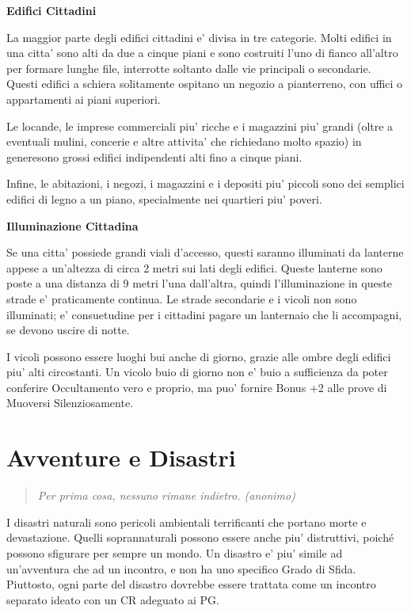\documentclass[a4paper,11pt,twoside,openany]{book}
\begin{document}
{		\textbf{Edifici Cittadini}
		
		La maggior parte degli edifici cittadini e' divisa in tre categorie. Molti edifici in una citta' sono alti da due a cinque piani e sono costruiti l'uno di fianco all'altro per formare lunghe file, interrotte soltanto dalle vie principali o secondarie. Questi edifici a schiera solitamente ospitano un negozio a pianterreno, con uffici o appartamenti ai piani superiori.
		
		Le locande, le imprese commerciali piu' ricche e i magazzini piu' grandi (oltre a eventuali mulini, concerie e altre attivita' che richiedano molto spazio) in generesono grossi edifici indipendenti alti fino a cinque piani.
		
		Infine, le abitazioni, i negozi, i magazzini e i depositi piu' piccoli sono dei semplici edifici di legno a un piano, specialmente nei quartieri piu' poveri.
		
		\textbf{Illuminazione Cittadina}
		
		Se una citta' possiede grandi viali d'accesso, questi saranno illuminati da lanterne appese a un'altezza di circa 2 metri sui lati degli edifici. Queste lanterne sono poste a una distanza di 9 metri l'una dall'altra, quindi l'illuminazione in queste strade e' praticamente continua. Le strade secondarie e i vicoli non sono illuminati; e' consuetudine per i cittadini pagare un lanternaio che li accompagni, se devono uscire di notte.
		
		I vicoli possono essere luoghi bui anche di giorno, grazie alle ombre degli edifici piu' alti circostanti. Un vicolo buio di giorno non e' buio a sufficienza da poter conferire Occultamento vero e proprio, ma puo' fornire Bonus +2 alle prove di Muoversi Silenziosamente.
		
		\pagebreak
		
		\section{Avventure e Disastri}
		
		\label{avventure-e-disastri}
		\begin{quote}\textit{
				Per prima cosa, nessuno rimane indietro. (anonimo)
		}\end{quote}
		I disastri naturali sono pericoli ambientali terrificanti che portano morte e devastazione. Quelli soprannaturali posso­no essere anche piu' distruttivi, poiché possono sfigurare per sempre un mondo. Un disastro e' piu' simile ad un'avventura che ad un incontro, e non ha uno specifico Grado di Sfida. Piuttosto, ogni parte del disastro dovrebbe essere trattata come un incontro separato ideato con un CR adeguato ai PG.
		
}
\end{document}
